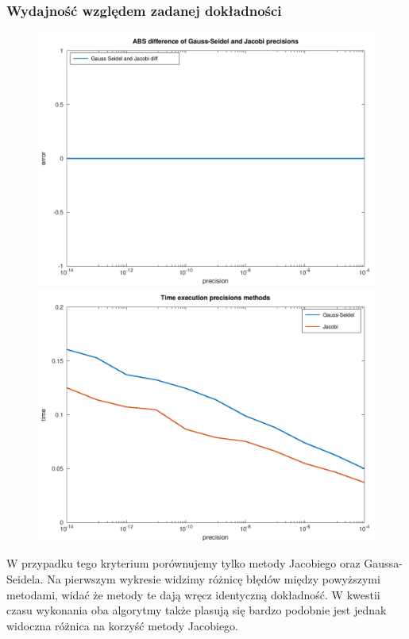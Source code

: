 \documentclass[10pt]{article}
\begin{document}
\subsubsection{Wydajność względem zadanej dokładności}
\begin{figure}[h]
\centering
\includegraphics[scale=0.45]{plots/05_abs_precision_methods_all_rows.png}
\includegraphics[scale=0.45]{plots/06_time_precision_methods_all_rows.png}
\end{figure}
W przypadku tego kryterium porównujemy tylko metody Jacobiego oraz Gaussa-Seidela. Na pierwszym wykresie widzimy różnicę błędów między powyższymi metodami, widać że metody te dają wręcz identyczną dokładność. W kwestii czasu wykonania oba algorytmy także plasują się bardzo podobnie jest jednak widoczna różnica na korzyść metody Jacobiego.
\end{document}
